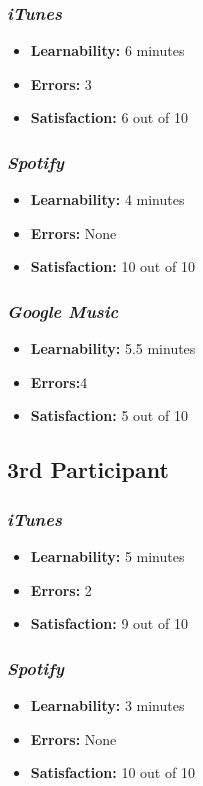 \documentclass{article}
\begin{document}
{\begin{multicols}{2}
\subsubsection{\it iTunes}
\begin{itemize}
	\item {\bf Learnability:} 6 minutes
	\item {\bf Errors:}  3
	\item {\bf Satisfaction:} 6 out of 10 
\end{itemize}

\subsubsection{\it Spotify}
\begin{itemize}
	\item {\bf Learnability:} 4 minutes
	\item {\bf Errors:} None
	\item {\bf Satisfaction:} 10 out of 10 
\end{itemize}

\subsubsection{\it Google Music}
\begin{itemize}
\item {\bf Learnability:} 5.5 minutes
	\item {\bf Errors:}4 
	\item {\bf Satisfaction:} 5 out of 10 
\end{itemize}

\subsection{3rd Participant}

\subsubsection{\it iTunes}
\begin{itemize}
	\item {\bf Learnability:} 5 minutes
	\item {\bf Errors:}  2
	\item {\bf Satisfaction:} 9 out of 10 
\end{itemize}

\subsubsection{\it Spotify}
\begin{itemize}
	\item {\bf Learnability:} 3 minutes
	\item {\bf Errors:} None
	\item {\bf Satisfaction:} 10 out of 10 
\end{itemize}


\end{multicols}}
\end{document}

